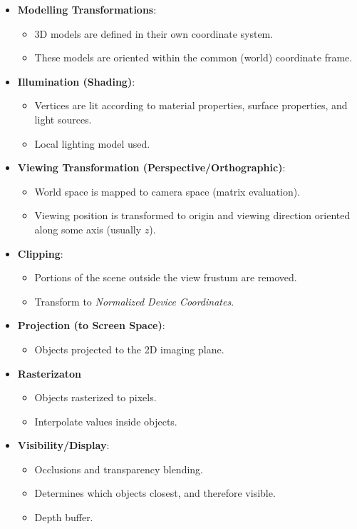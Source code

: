 \documentclass[11pt]{article}
\begin{document}
\begin{itemize}
  \item \textbf{Modelling Transformations}:
    \begin{itemize}
      \item 3D models are defined in their own coordinate system.
      \item These models are oriented within the common (world) coordinate frame.
    \end{itemize}
  \item \textbf{Illumination (Shading)}:
    \begin{itemize}
      \item Vertices are lit according to material properties, surface properties, and light sources.
      \item Local lighting model used.
    \end{itemize}
  \item \textbf{Viewing Transformation (Perspective/Orthographic)}:
    \begin{itemize}
      \item World space is mapped to camera space (matrix evaluation).
      \item Viewing position is transformed to origin and viewing direction oriented along some axis (usually $z$).
    \end{itemize}
  \item \textbf{Clipping}:
    \begin{itemize}
      \item Portions of the scene outside the view frustum are removed.
      \item Transform to \textit{Normalized Device Coordinates}.
    \end{itemize}
  \item \textbf{Projection (to Screen Space)}:
    \begin{itemize}
      \item Objects projected to the 2D imaging plane.
    \end{itemize}
  \item \textbf{Rasterizaton}
    \begin{itemize}
      \item Objects rasterized to pixels.
      \item Interpolate values inside objects.
    \end{itemize}
  \item \textbf{Visibility/Display}:
    \begin{itemize}
      \item Occlusions and transparency blending.
      \item Determines which objects closest, and therefore visible.
      \item Depth buffer.
    \end{itemize}
\end{itemize}
\end{document}
